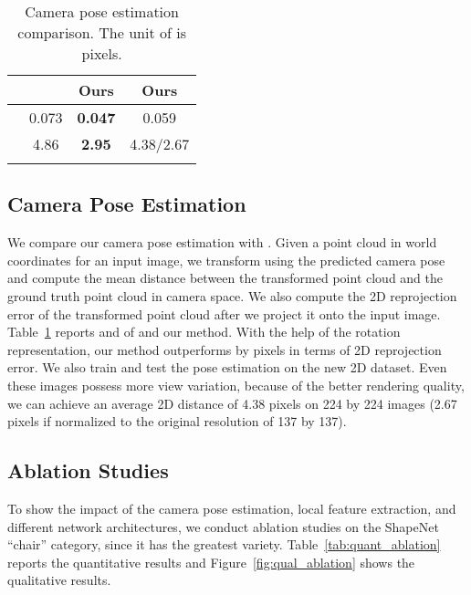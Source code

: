 \begin{table}[]
\begin{minipage}{.4\textwidth}
    \centering
    \setlength{\arrayrulewidth}{1pt}
    \begin{tabular}{c|ccc}
                    \Xhline{2\arrayrulewidth}
        &  \cite{insafutdinov18pointclouds} & Ours & Ours \\ \hline
     &  0.073  &  \textbf{0.047}  &  0.059 \\ \hline
      &  4.86  &   \textbf{2.95}  &  4.38/2.67 \\ 
                    \Xhline{2\arrayrulewidth}
    \end{tabular}
    \vspace{3pt}
    \caption {Camera pose estimation comparison. The unit of  is pixels.}
\label{tab:camest}
\end{minipage}
\vspace{-10pt}
\end{table}


\vspace{-10pt}
\subsection{Camera Pose Estimation}
\label{sec:exp:cam}
\vspace{-5pt}

We compare our camera pose estimation with \cite{insafutdinov18pointclouds}. Given a point cloud  in world coordinates for an input image, we transform  using the predicted camera pose and compute the mean distance  between the transformed point cloud and the ground truth point cloud in camera space. We also compute the 2D reprojection error  of the transformed point cloud after we project it onto the input image. Table~\ref{tab:camest} reports  and  of \cite{insafutdinov18pointclouds} and our method. With the help of the  rotation representation, our method outperforms \cite{insafutdinov18pointclouds} by  pixels in terms of 2D reprojection error. We also train and test the pose estimation on the new 2D dataset. Even these images possess more view variation, because of the better rendering quality, we can achieve an average 2D distance of 4.38 pixels on 224 by 224 images (2.67 pixels if normalized to the original resolution of 137 by 137).
\subsection{Ablation Studies}
\label{sec:exp:ablation}
\vspace{-5pt}
To show the impact of the camera pose estimation, local feature extraction, and different network architectures, we conduct ablation studies on the ShapeNet ``chair'' category, since it has the greatest variety. Table~\ref{tab:quant_ablation} reports the quantitative results and Figure~\ref{fig:qual_ablation} shows the qualitative results.
\vspace{-5pt}

